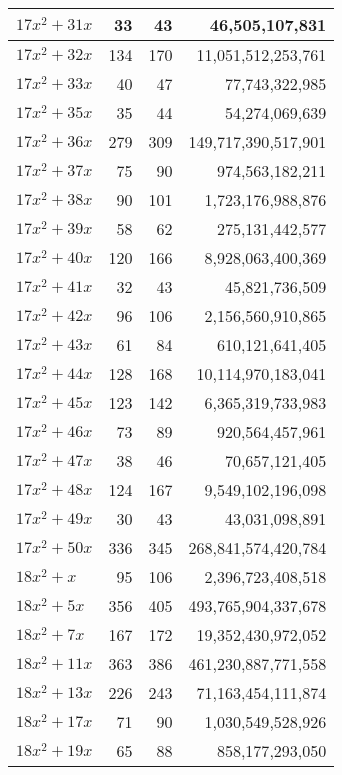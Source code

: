 \documentclass[a4paper]{amsproc}
\theoremstyle{plain}
\begin{document}
\begin{longtable}{ | l | r | r | r | }
$17x^2 + 31x$ & 33 & 43 & 46{,}505{,}107{,}831 \\ \hline
$17x^2 + 32x$ & 134 & 170 & 11{,}051{,}512{,}253{,}761 \\ \hline
$17x^2 + 33x$ & 40 & 47 & 77{,}743{,}322{,}985 \\ \hline
$17x^2 + 35x$ & 35 & 44 & 54{,}274{,}069{,}639 \\ \hline
$17x^2 + 36x$ & 279 & 309 & 149{,}717{,}390{,}517{,}901 \\ \hline
$17x^2 + 37x$ & 75 & 90 & 974{,}563{,}182{,}211 \\ \hline
$17x^2 + 38x$ & 90 & 101 & 1{,}723{,}176{,}988{,}876 \\ \hline
$17x^2 + 39x$ & 58 & 62 & 275{,}131{,}442{,}577 \\ \hline
$17x^2 + 40x$ & 120 & 166 & 8{,}928{,}063{,}400{,}369 \\ \hline
$17x^2 + 41x$ & 32 & 43 & 45{,}821{,}736{,}509 \\ \hline
$17x^2 + 42x$ & 96 & 106 & 2{,}156{,}560{,}910{,}865 \\ \hline
$17x^2 + 43x$ & 61 & 84 & 610{,}121{,}641{,}405 \\ \hline
$17x^2 + 44x$ & 128 & 168 & 10{,}114{,}970{,}183{,}041 \\ \hline
$17x^2 + 45x$ & 123 & 142 & 6{,}365{,}319{,}733{,}983 \\ \hline
$17x^2 + 46x$ & 73 & 89 & 920{,}564{,}457{,}961 \\ \hline
$17x^2 + 47x$ & 38 & 46 & 70{,}657{,}121{,}405 \\ \hline
$17x^2 + 48x$ & 124 & 167 & 9{,}549{,}102{,}196{,}098 \\ \hline
$17x^2 + 49x$ & 30 & 43 & 43{,}031{,}098{,}891 \\ \hline
$17x^2 + 50x$ & 336 & 345 & 268{,}841{,}574{,}420{,}784 \\ \hline
$18x^2 + x$ & 95 & 106 & 2{,}396{,}723{,}408{,}518 \\ \hline
$18x^2 + 5x$ & 356 & 405 & 493{,}765{,}904{,}337{,}678 \\ \hline
$18x^2 + 7x$ & 167 & 172 & 19{,}352{,}430{,}972{,}052 \\ \hline
$18x^2 + 11x$ & 363 & 386 & 461{,}230{,}887{,}771{,}558 \\ \hline
$18x^2 + 13x$ & 226 & 243 & 71{,}163{,}454{,}111{,}874 \\ \hline
$18x^2 + 17x$ & 71 & 90 & 1{,}030{,}549{,}528{,}926 \\ \hline
$18x^2 + 19x$ & 65 & 88 & 858{,}177{,}293{,}050 \\ \hline

\end{longtable}
\end{document}
